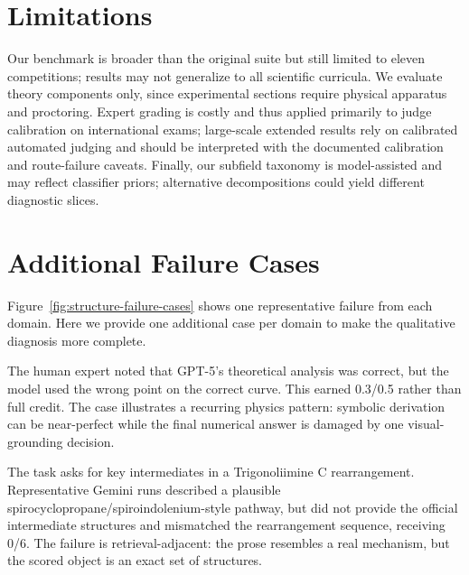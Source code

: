 \documentclass[11pt]{article}
\begin{document}
\section*{Limitations}
Our benchmark is broader than the original suite but still limited to eleven competitions; results may not generalize to all scientific curricula.
We evaluate theory components only, since experimental sections require physical apparatus and proctoring.
Expert grading is costly and thus applied primarily to judge calibration on international exams; large-scale extended results rely on calibrated automated judging and should be interpreted with the documented calibration and route-failure caveats.
Finally, our subfield taxonomy is model-assisted and may reflect classifier priors; alternative decompositions could yield different diagnostic slices.





\appendix

\section{Additional Failure Cases}
\label{app:additional_cases}
Figure~\ref{fig:structure-failure-cases} shows one representative failure from each domain.
Here we provide one additional case per domain to make the qualitative diagnosis more complete.

\begin{tcolorbox}[
  title={Physics: correct theory, wrong graph binding (IPhO 2025 S1 B2)},
  colback=gray!3,
  colframe=black!35,
  boxrule=0.6pt,
  arc=1.5mm,
  left=1.5mm,right=1.5mm,top=1mm,bottom=1mm
]
\footnotesize
The human expert noted that GPT-5's theoretical analysis was correct, but the model used the wrong point on the correct curve.
This earned 0.3/0.5 rather than full credit.
The case illustrates a recurring physics pattern: symbolic derivation can be near-perfect while the final numerical answer is damaged by one visual-grounding decision.
\end{tcolorbox}

\begin{tcolorbox}[
  title={Chemistry: plausible mechanism, wrong intermediates (CChO 2025 Q9.7)},
  colback=gray!3,
  colframe=black!35,
  boxrule=0.6pt,
  arc=1.5mm,
  left=1.5mm,right=1.5mm,top=1mm,bottom=1mm
]
\footnotesize
The task asks for key intermediates in a Trigonoliimine C rearrangement.
Representative Gemini runs described a plausible spirocyclopropane/spiroindolenium-style pathway, but did not provide the official intermediate structures and mismatched the rearrangement sequence, receiving 0/6.
The failure is retrieval-adjacent: the prose resembles a real mechanism, but the scored object is an exact set of structures.
\end{tcolorbox}
\end{document}
